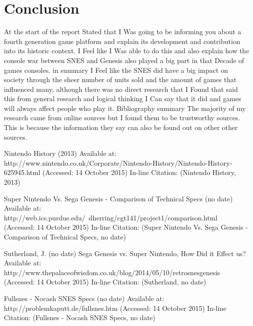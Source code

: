\documentclass{scrartcl}
\begin{document}
\section{Conclusion}

At the start of the report Stated that I Was going to be informing you about a fourth generation game platform and explain its development and contribution into its historic context. I Feel like I Was able to do this and also explain how the console war between SNES and Genesis also played a big part in that Decade of games consoles. in summary I Feel like the SNES did have a big impact on society through the sheer number of units sold and the amount of games that influenced many, although there was no direct research that I Found that said this from general research and logical thinking I Can say that it did and games will always affect people who play it.
Bibliography summary
The majority of my research came from online sources but I found them to be trustworthy sources. This is because the information they say can also be found out on other other sources.


Nintendo History (2013) Available at: http://www.nintendo.co.uk/Corporate/Nintendo-History/Nintendo-History-625945.html (Accessed: 14 October 2015) In-line Citation: (Nintendo History, 2013)

Super Nintendo Vs. Sega Genesis - Comparison of Technical Specs (no date) Available at: http://web.ics.purdue.edu/~dherring/cgt141/project1/comparison.html (Accessed: 14 October 2015) In-line Citation: (Super Nintendo Vs. Sega Genesis - Comparison of Technical Specs, no date)

Sutherland, J. (no date) Sega Genesis vs. Super Nintendo, How Did it Effect us? Available at: http://www.thepalaceofwisdom.co.uk/blog/2014/05/10/retrosnesgenesis (Accessed: 14 October 2015) In-line Citation: (Sutherland, no date)


Fullsnes - Nocash SNES Specs (no date) Available at: http://problemkaputt.de/fullsnes.htm (Accessed: 14 October 2015) In-line Citation: (Fullsnes - Nocash SNES Specs, no date)
\end{document}
